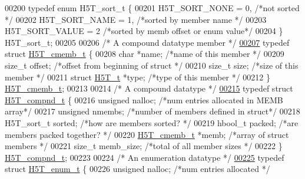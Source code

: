 \begin{DoxyCode}
00200 \textcolor{keyword}{typedef} \textcolor{keyword}{enum} H5T\_sort\_t \{
00201     H5T\_SORT\_NONE   = 0,        \textcolor{comment}{/*not sorted                 */}
00202     H5T\_SORT\_NAME   = 1,        \textcolor{comment}{/*sorted by member name          */}
00203     H5T\_SORT\_VALUE  = 2         \textcolor{comment}{/*sorted by memb offset or enum value*/}
00204 \} H5T\_sort\_t;
00205 
00206 \textcolor{comment}{/* A compound datatype member */}
\hyperlink{struct_h5_t__cmemb__t}{00207} \textcolor{keyword}{typedef} \textcolor{keyword}{struct }\hyperlink{struct_h5_t__cmemb__t}{H5T\_cmemb\_t} \{
00208     \textcolor{keywordtype}{char}        *name;      \textcolor{comment}{/*name of this member            */}
00209     \textcolor{keywordtype}{size\_t}      offset;     \textcolor{comment}{/*offset from beginning of struct    */}
00210     \textcolor{keywordtype}{size\_t}      size;       \textcolor{comment}{/*size of this member            */}
00211     \textcolor{keyword}{struct }\hyperlink{struct_h5_t__t}{H5T\_t}   *type;      \textcolor{comment}{/*type of this member            */}
00212 \} \hyperlink{struct_h5_t__cmemb__t}{H5T\_cmemb\_t};
00213 
00214 \textcolor{comment}{/* A compound datatype */}
\hyperlink{struct_h5_t__compnd__t}{00215} \textcolor{keyword}{typedef} \textcolor{keyword}{struct }\hyperlink{struct_h5_t__compnd__t}{H5T\_compnd\_t} \{
00216     \textcolor{keywordtype}{unsigned}    nalloc;     \textcolor{comment}{/*num entries allocated in MEMB array*/}
00217     \textcolor{keywordtype}{unsigned}    nmembs;     \textcolor{comment}{/*number of members defined in struct*/}
00218     H5T\_sort\_t  sorted;     \textcolor{comment}{/*how are members sorted?        */}
00219     hbool\_t     packed;     \textcolor{comment}{/*are members packed together?       */}
00220     \hyperlink{struct_h5_t__cmemb__t}{H5T\_cmemb\_t}  *memb;      \textcolor{comment}{/*array of struct members        */}
00221     \textcolor{keywordtype}{size\_t}      memb\_size;  \textcolor{comment}{/*total of all member sizes          */}
00222 \} \hyperlink{struct_h5_t__compnd__t}{H5T\_compnd\_t};
00223 
00224 \textcolor{comment}{/* An enumeration datatype */}
\hyperlink{struct_h5_t__enum__t}{00225} \textcolor{keyword}{typedef} \textcolor{keyword}{struct }\hyperlink{struct_h5_t__enum__t}{H5T\_enum\_t} \{
00226     \textcolor{keywordtype}{unsigned}    nalloc;     \textcolor{comment}{/*num entries allocated          */}

\end{DoxyCode}
